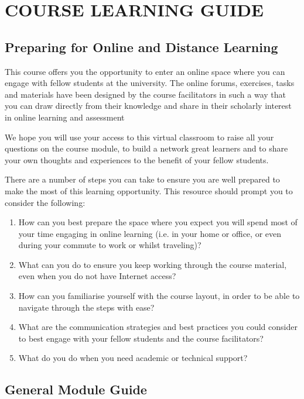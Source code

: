 \section{COURSE LEARNING GUIDE}


\subsection*{Preparing for Online and Distance Learning}

This course offers you the opportunity to enter an online space where you can engage with fellow students at the university. The online forums, exercises, tasks and materials have been designed by the course facilitators in such a way that you can draw directly from their knowledge and share in their scholarly interest in online learning and assessment

We hope you will use your access to this virtual classroom to raise all your questions on the course module, to build a network great learners and to share your own thoughts and experiences to the benefit of your fellow students.

   
There are a number of steps you can take to ensure you are well prepared to make the most of this learning opportunity. This resource should prompt you to consider the following:


 \begin{enumerate}[label=\cb$\square$]
   \item How can you best prepare the space where you expect you will spend most of your time engaging in online learning (i.e. in your home or office, or even during your commute to work or whilst traveling)?
  \item   What can you do to ensure you keep working through the course material, even when you do not have Internet access?
    \item How can you familiarise yourself with the course layout, in order to be able to navigate through the steps with ease?
    \item What are the communication strategies and best practices you could consider to best engage with your fellow students and the course facilitators?
    \item What do you do when you need academic or technical support?

 \end{enumerate} 

\subsection*{General Module Guide}

